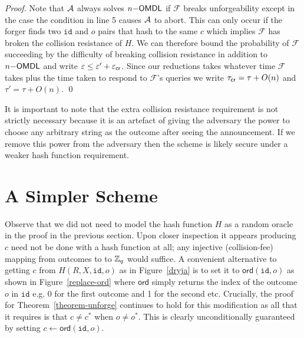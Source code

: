 \documentclass[runningheads]{llncs}
\newcommand{\eventid}{\mathtt{id}}
\newcommand{\F}{\mathcal{F}}
\begin{document}
\begin{proof}
    Note that $\mathcal{A}$ always solves $n\mathsf{-OMDL}$ if $\F$ breaks unforgeability except in the case the condition in line 5 causes $\mathcal{A}$ to abort.
    This can only occur if the forger finds two $\eventid$ and $o$ pairs that hash to the same $c$ which implies $\F$ has broken the collision resistance of $H$.
    We can therefore bound the probability of $\F$ succeeding by the difficulty of breaking collision resistance in addition to $n\mathsf{-OMDL}$ and write $\varepsilon \leq \varepsilon' + \varepsilon_{\mathsf{cr}}$.
    Since our reductions takes whatever time $\F$ takes plus the time taken to respond to $\F$'s queries we write $\tau_{\mathsf{cr}} = \tau + O(n)$ and $\tau' = \tau + O(n)$.
\qed
\end{proof}

It is important to note that the extra collision resistance requirement is not strictly necessary because it is an artefact of giving the adversary the power to choose any arbitrary string as the outcome after seeing the announcement.
If we remove this power from the adversary then the scheme is likely secure under a weaker hash function requirement.


\section{A Simpler Scheme}
\label{simple}
\newcommand{\ord}{\mathsf{ord}}

Observe that we did not need to model the hash function $H$ as a random oracle in the proof in the previous section.
Upon closer inspection it appears producing $c$ need not be done with a hash function at all; any injective (collision-fee) mapping from outcomes to to $\mathbb{Z}_q$ would suffice.
A convenient alternative to getting $c$ from $H(R, X, \eventid, o)$ as in Figure~\ref{dryja} is to set it to $\ord(\eventid,o)$ as shown in Figure~\ref{replace-ord} where $\ord$ simply returns the index of the outcome $o$ in $\eventid$ e.g. 0 for the first outcome and 1 for the second etc.
Crucially, the proof for Theorem~\ref{theorem-unforge} continues to hold for this modification as all that it requires is that $c \neq c^*$ when $o \neq o^{*}$.
This is clearly unconditionally guaranteed by setting $c \gets \ord(\eventid, o)$.
\end{document}
